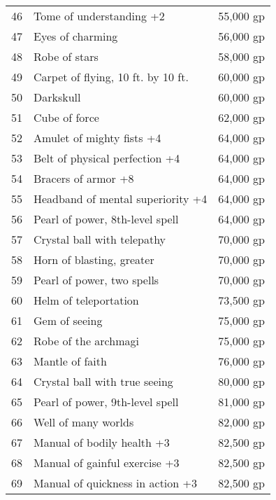 \begin{table}[]
\begin{tabularx}{\linewidth}{lXl}
46  & Tome of understanding +2                       & 55,000 gp    \\
47  & Eyes of charming                               & 56,000 gp    \\
48  & Robe of stars                                  & 58,000 gp    \\
49  & Carpet of flying, 10 ft. by 10 ft.             & 60,000 gp    \\
50  & Darkskull                                      & 60,000 gp    \\
51  & Cube of force                                  & 62,000 gp    \\
52  & Amulet of mighty fists +4                      & 64,000 gp    \\
53  & Belt of physical perfection +4                 & 64,000 gp    \\
54  & Bracers of armor +8                            & 64,000 gp    \\
55  & Headband of mental superiority +4              & 64,000 gp    \\
56  & Pearl of power, 8th-level spell                & 64,000 gp    \\
57  & Crystal ball with telepathy                    & 70,000 gp    \\
58  & Horn of blasting, greater                      & 70,000 gp    \\
59  & Pearl of power, two spells                     & 70,000 gp    \\
60  & Helm of teleportation                          & 73,500 gp    \\
61  & Gem of seeing                                  & 75,000 gp    \\
62  & Robe of the archmagi                           & 75,000 gp    \\
63  & Mantle of faith                                & 76,000 gp    \\
64  & Crystal ball with true seeing                  & 80,000 gp    \\
65  & Pearl of power, 9th-level spell                & 81,000 gp    \\
66  & Well of many worlds                            & 82,000 gp    \\
67  & Manual of bodily health +3                     & 82,500 gp    \\
68  & Manual of gainful exercise +3                  & 82,500 gp    \\
69  & Manual of quickness in action +3               & 82,500 gp    \\

\end{tabularx}
\end{table}

